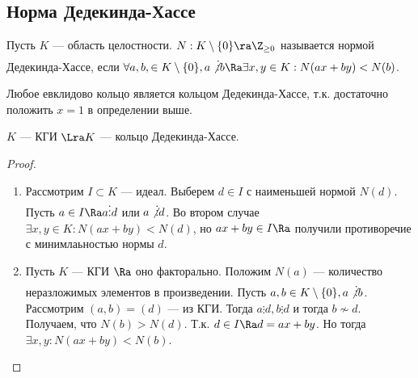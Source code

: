 
\subsection{Норма Дедекинда-Хассе}

\begin{definition}
    Пусть \(K\) --- область целостности. \(N: K \setminus \{0\} \ra \Z_{\ge 0}\) называется нормой Дедекинда-Хассе, если \(\forall a, b, \in K \setminus \{0\}, a \not\vdots b \Ra \exists x, y \in K: N(ax + by) < N(b)\).
\end{definition}

\begin{note}
    Любое евклидово кольцо является кольцом Дедекинда-Хассе, т.к. достаточно положить \(x = 1\) в определении выше.
\end{note}

\begin{proposition}
    \(K\) --- КГИ \(\Lra K\) --- кольцо Дедекинда-Хассе.
\end{proposition}
\begin{proof}\indent
    \begin{enumerate}
        \item[\(\La\)] Рассмотрим \(I \subset K\) --- идеал. Выберем \(d \in I\) с наименьшей нормой \(N(d)\). Пусть \(a \in I \Ra a \vdots d\) или \(a \not\vdots d\). Во втором случае \(\exists x, y \in K: N(ax + by) < N(d)\), но \(ax + by \in I \Ra\) получили противоречие с минимлаьностью нормы \(d\).
        \item[\(\Ra\)] Пусть \(K\) --- КГИ \(\Ra\) оно факторально. Положим \(N(a)\) --- количество неразложимых элементов в произведении. Пусть \(a, b \in K \setminus \{0\}, a\not\vdots b\). Рассмотрим \((a, b) = (d)\) --- из КГИ. Тогда \(a \vdots d, b \vdots d\) и тогда \(b \not\sim d\). Получаем, что \(N(b) > N(d)\). Т.к. \(d \in I \Ra d = ax + by\). Но тогда \(\exists x, y: N(ax + by) < N(b)\).
    \end{enumerate}
\end{proof}

